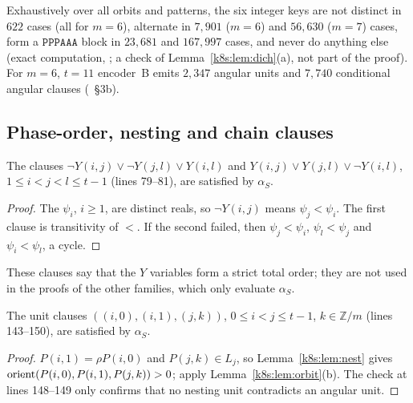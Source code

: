 Exhaustively over all orbits and patterns, the six integer keys are not distinct in $622$ cases (all for $m=6$),
alternate in $7{,}901$ ($m=6$) and $56{,}630$ ($m=7$) cases, form a $\mathtt{PPPAAA}$ block in $23{,}681$ and
$167{,}997$ cases, and never do anything else (exact computation, ; a check of
Lemma~\ref{k8s:lem:dich}(a), not part of the proof). For $m=6$, $t=11$ encoder~B emits $2{,}347$ angular units and
$7{,}740$ conditional angular clauses (~\S3b).

\subsection{Phase-order, nesting and chain clauses}\label{k8s:sec:other}

\begin{lemma}\label{k8s:lem:order}
The clauses $\neg Y(i,j)\vee\neg Y(j,l)\vee Y(i,l)$ and $Y(i,j)\vee Y(j,l)\vee\neg Y(i,l)$, $1\le i<j<l\le t-1$ (lines
79--81), are satisfied by $\alpha_S$.
\end{lemma}

\begin{proof}
The $\psi_i$, $i\ge1$, are distinct reals, so $\neg Y(i,j)$ means $\psi_j<\psi_i$. The first clause is transitivity of
$<$. If the second failed, then $\psi_j<\psi_i$, $\psi_l<\psi_j$ and $\psi_i<\psi_l$, a cycle.
\end{proof}

These clauses say that the $Y$ variables form a strict total order; they are not used in the proofs of the other
families, which only evaluate $\alpha_S$.

\begin{lemma}\label{k8s:lem:nestcl}
The unit clauses $((i,0),(i,1),(j,k))$, $0\le i<j\le t-1$, $k\in\mathbb Z/m$ (lines 143--150), are satisfied
by $\alpha_S$.
\end{lemma}

\begin{proof}
$P(i,1)=\rho P(i,0)$ and $P(j,k)\in L_j$, so Lemma~\ref{k8s:lem:nest} gives $\operatorname{orient}(P(i,0),P(i,1),P(j,k))>0$; apply
Lemma~\ref{k8s:lem:orbit}(b). The check at lines 148--149 only confirms that no nesting unit contradicts an angular
unit.
\end{proof}

